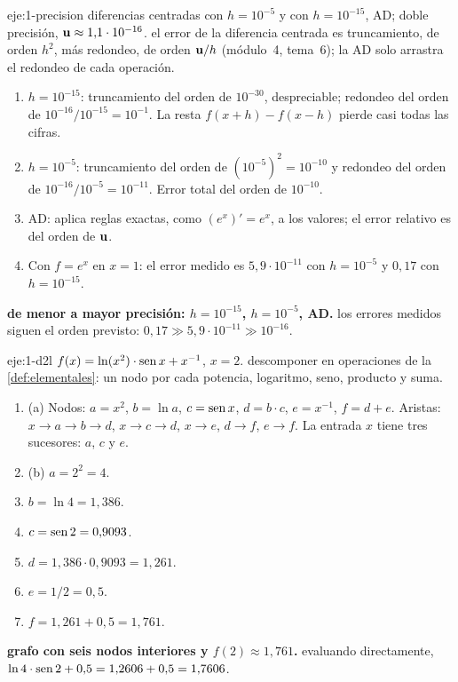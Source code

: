 \begin{solucion}{eje:1-precision}
\datos diferencias centradas con $h=10^{-5}$ y con $h=10^{-15}$, AD; doble precisión, $\mathbf{u}\approx 1{,}1\cdot 10^{-16}$.
\planteamiento el error de la diferencia centrada es truncamiento, de orden $h^{2}$, más redondeo, de orden $\mathbf{u}/h$ (módulo~4, tema~6); la AD solo arrastra el redondeo de cada operación.
\pasos
\begin{enumerate}[label=\arabic*.]
  \item $h=10^{-15}$: truncamiento del orden de $10^{-30}$, despreciable; redondeo del orden de $10^{-16}/10^{-15}=10^{-1}$. La resta $f(x+h)-f(x-h)$ pierde casi todas las cifras.
  \item $h=10^{-5}$: truncamiento del orden de $(10^{-5})^{2}=10^{-10}$ y redondeo del orden de $10^{-16}/10^{-5}=10^{-11}$. Error total del orden de $10^{-10}$.
  \item AD: aplica reglas exactas, como $(e^{x})'=e^{x}$, a los valores; el error relativo es del orden de $\mathbf{u}$.
  \item Con $f=e^{x}$ en $x=1$: el error medido es $5{,}9\cdot 10^{-11}$ con $h=10^{-5}$ y $0{,}17$ con $h=10^{-15}$.
\end{enumerate}
\resultado \textbf{de menor a mayor precisión: $h=10^{-15}$, $h=10^{-5}$, AD.}
\comprobacion los errores medidos siguen el orden previsto: $0{,}17\gg 5{,}9\cdot 10^{-11}\gg 10^{-16}$.
\end{solucion}

\begin{solucion}{eje:1-d2l}
\datos $f(x)=\ln(x^{2})\cdot\operatorname{sen} x+x^{-1}$, $x=2$.
\planteamiento descomponer en operaciones de la \cref{def:elementales}: un nodo por cada potencia, logaritmo, seno, producto y suma.
\pasos
\begin{enumerate}[label=\arabic*.]
  \item (a) Nodos: $a=x^{2}$, $b=\ln a$, $c=\operatorname{sen} x$, $d=b\cdot c$, $e=x^{-1}$, $f=d+e$. Aristas: $x\to a\to b\to d$, $x\to c\to d$, $x\to e$, $d\to f$, $e\to f$. La entrada $x$ tiene tres sucesores: $a$, $c$ y $e$.
  \item (b) $a=2^{2}=4$.
  \item $b=\ln 4=1{,}386$.
  \item $c=\operatorname{sen} 2=0{,}9093$.
  \item $d=1{,}386\cdot 0{,}9093=1{,}261$.
  \item $e=1/2=0{,}5$.
  \item $f=1{,}261+0{,}5=1{,}761$.
\end{enumerate}
\resultado \textbf{grafo con seis nodos interiores y $f(2)\approx 1{,}761$.}
\comprobacion evaluando directamente, $\ln 4\cdot\operatorname{sen} 2+0{,}5=1{,}2606+0{,}5=1{,}7606$.
\end{solucion}

